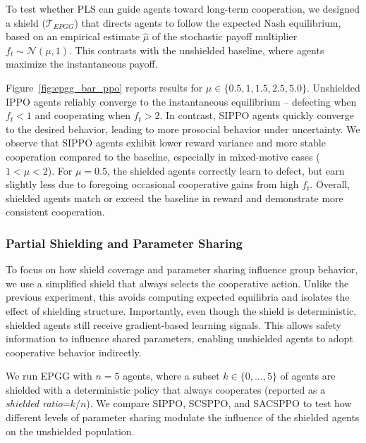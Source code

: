 \documentclass{ecai}
\newcommand{\shieldname}[1]{$\mathcal{T}_{#1}$}
\theoremstyle{plain}
\theoremstyle{definition}
\theoremstyle{remark}
\begin{document}
To test whether PLS can guide agents toward long-term cooperation, we designed a shield (\shieldname{EPGG}) that directs agents to follow the expected Nash equilibrium, based on an empirical estimate $\hat{\mu}$ of the stochastic payoff multiplier $f_t \sim \mathcal{N}(\mu, 1)$. This contrasts with the unshielded baseline, where agents maximize the instantaneous payoff.

Figure~\ref{fig:epgg_bar_ppo} reports results for $\mu \in \{0.5, 1, 1.5, 2.5, 5.0\}$. Unshielded IPPO agents reliably converge to the instantaneous equilibrium -- defecting when $f_t<1$ and cooperating when $f_t>2$. In contrast, SIPPO agents quickly converge to the desired behavior, leading to more prosocial behavior under uncertainty. We observe that SIPPO agents exhibit lower reward variance and more stable cooperation compared to the baseline, especially in mixed-motive cases ($1 < \mu < 2$). For $\mu = 0.5$, the shielded agents correctly learn to defect, but earn slightly less due to foregoing occasional cooperative gains from high $f_t$. Overall, shielded agents match or exceed the baseline in reward and demonstrate more consistent cooperation.
\subsubsection{Partial Shielding and Parameter Sharing}

To focus on how shield coverage and parameter sharing influence group behavior, we use a simplified shield that always selects the cooperative action. Unlike the previous experiment, this avoids computing expected equilibria and isolates the effect of shielding structure. Importantly, even though the shield is deterministic, shielded agents still receive gradient-based learning signals. This allows safety information to influence shared parameters, enabling unshielded agents to adopt cooperative behavior indirectly.

We run EPGG with $n=5$ agents, where a subset $k\in\{0,\dots,5\}$ of agents are shielded with a deterministic policy that always cooperates (reported as a \textit{shielded ratio}=$k/n$). We compare SIPPO, SCSPPO, and SACSPPO to test how different levels of parameter sharing modulate the influence of the shielded agents on the unshielded population.
\end{document}
